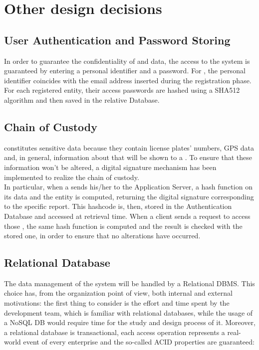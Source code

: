 \documentclass[../../DD.tex]{subfiles}
\begin{document}
\section{Other design decisions\label{sect:2.7}}

\subsection{User Authentication and Password Storing\label{2.7.1}}
In order to guarantee the confidentiality of  and  data, the access to the system is guaranteed by entering a personal identifier and a password. For , the personal identifier coincides with the email address inserted during the registration phase. \\

For each registered entity, their access passwords are hashed using a SHA512 algorithm and then saved in the relative Database.

\subsection{Chain of Custody\label{2.7.2}}
 constitutes sensitive data because they contain license plates' numbers, GPS data and, in general, information about  that will be shown to a . To ensure that these information won't be altered, a digital signature mechanism has been implemented to realize the chain of custody. \\

In particular, when a  sends his/her  to the Application Server, a hash function on its data and the  entity is computed, returning the digital signature corresponding to the specific report. This hashcode is, then, stored in the Authentication Database and accessed at retrieval time. 
When a  client sends a request to access those , the same hash function is computed and the result is checked with the stored one, in order to ensure that no alterations have occurred. \\



\subsection{Relational Database\label{2.7.3}}
The data management of the system will be handled by a Relational DBMS. This choice has, from the organization point of view, both internal and external motivations: the first thing to consider is the effort and time spent by the development team, which is familiar with relational databases, while the usage of a NoSQL DB would require time for the study and design process of it.
Moreover, a relational database is transactional, each access operation represents a real-world event of every enterprise and the so-called ACID properties are guaranteed:
\end{document}
